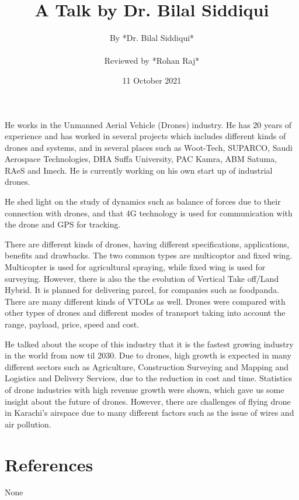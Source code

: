 \documentclass{article}
\title{A Talk by Dr. Bilal Siddiqui} %
\author{By *Dr. Bilal Siddiqui* \\ \\ Reviewed by *Rohan Raj*} %
\date{11 October 2021} %
\begin{document}
\maketitle
He works in the Unmanned Aerial Vehicle (Drones) industry. He has 20 years of experience and has worked in several projects which includes different kinds of drones and systems, and in several places such as Woot-Tech, SUPARCO, Saudi Aerospace Technologies, DHA Suffa University, PAC Kamra, ABM Satuma, RAeS and Imech. He is currently working on his own start up of industrial drones.
\par
He shed light on the study of dynamics such as balance of forces due to their connection with drones, and that 4G technology is used for communication with the drone and GPS for tracking. 
\par
There are different kinds of drones, having different specifications, applications, benefits and drawbacks. The two common types are multicoptor and fixed wing. Multicopter is used for agricultural spraying, while fixed wing is used for surveying. However, there is also the the evolution of Vertical Take off/Land Hybrid. It is planned for delivering parcel, for companies such as foodpanda. There are many different kinds of VTOLs as well. Drones were compared with other types of drones and different modes of transport taking into account the range, payload, price, speed and cost.
\par
He talked about the scope of this industry that it is the fastest growing industry in the world from now til 2030. Due to drones, high growth is expected in many different sectors such as Agriculture, Construction Surveying and Mapping and Logistics and Delivery Services, due to the reduction in cost and time. Statistics of drone industries with high revenue growth were shown, which gave us some insight about the future of drones. However, there are challenges of flying drone in Karachi’s airspace due to many different factors such as the issue of wires and air pollution.

\section*{References}
None 
\end{document}
